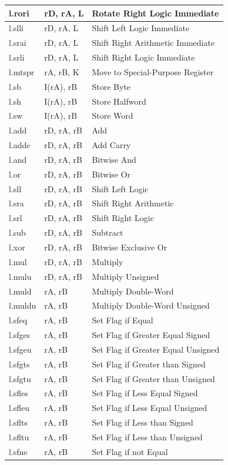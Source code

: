 \begin{longtable}{|p{1.8cm}|l|p{10cm}|}
l.rori&rD, rA, L&Rotate Right Logic Immediate\\ \hline
l.slli&rD, rA, L&Shift Left Logic Immediate\\ \hline
l.srai&rD, rA, L&Shift Right Arithmetic Immediate\\ \hline
l.srli&rD, rA, L&Shift Right Logic Immediate\\ \hline \hline

l.mtspr&rA, rB, K&Move to Special-Purpose Register\\ \hline
l.sb&I(rA), rB&Store Byte\\ \hline
l.sh&I(rA), rB&Store Halfword\\ \hline
l.sw&I(rA), rB&Store Word\\ \hline \hline
 
l.add&rD, rA, rB&Add\\ \hline
l.addc&rD, rA, rB&Add Carry\\ \hline
l.and&rD, rA, rB&Bitwise And\\ \hline
l.or&rD, rA, rB&Bitwise Or\\ \hline
l.sll&rD, rA, rB&Shift Left Logic\\ \hline
l.sra&rD, rA, rB&Shift Right Arithmetic\\ \hline
l.srl&rD, rA, rB&Shift Right Logic\\ \hline
l.sub&rD, rA, rB&Subtract\\ \hline
l.xor&rD, rA, rB&Bitwise Exclusive Or\\ \hline
l.mul&rD, rA, rB&Multiply\\ \hline
l.mulu&rD, rA, rB&Multiply Unsigned\\ \hline
l.muld&rA, rB&Multiply Double-Word\\ \hline
l.muldu&rA, rB&Multiply Double-Word Unsigned\\ \hline \hline

l.sfeq&rA, rB&Set Flag if Equal\\ \hline
l.sfges&rA, rB&Set Flag if Greater Equal Signed\\  \hline
l.sfgeu&rA, rB&Set Flag if Greater Equal Unsigned\\ \hline
l.sfgts&rA, rB&Set Flag if Greater than Signed\\ \hline
l.sfgtu&rA, rB&Set Flag if Greater than Unsigned\\ \hline
l.sfles&rA, rB&Set Flag if Less Equal Signed\\ \hline
l.sfleu&rA, rB&Set Flag if Less Equal Unsigned\\ \hline
l.sflts&rA, rB&Set Flag if Less than Signed\\ \hline
l.sfltu&rA, rB&Set Flag if Less than Unsigned\\ \hline
l.sfne&rA, rB&Set Flag if not Equal\\ \hline \hline


\end{longtable}
